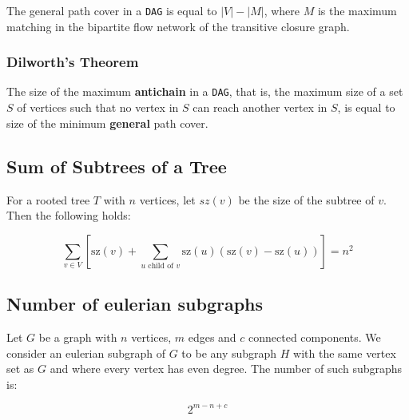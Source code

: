 The general path cover in a {\tt DAG} is equal to $|V| - |M|$, where $M$ is the maximum matching in the bipartite flow network of the transitive closure graph.

\subsubsection{Dilworth's Theorem}

The size of the maximum \textbf{antichain} in a {\tt DAG}, that is, the maximum size of a set $S$ of vertices such that no vertex in $S$ can reach another vertex in $S$, is equal to size of the minimum \textbf{general} path cover.

\subsection{Sum of Subtrees of a Tree}

For a rooted tree $T$ with $n$ vertices, let $sz(v)$ be the size of the subtree of $v$. Then the following holds:

$$ \sum_{v \in V} \left[\text{sz}(v) + \sum_{u \text{ child of } v} \text{sz}(u)(\text{sz}(v) - \text{sz}(u))\right] = n^2 $$

\subsection{Number of eulerian subgraphs}

Let $G$ be a graph with $n$ vertices, $m$ edges and $c$ connected components. We consider an eulerian subgraph of $G$ to be any subgraph $H$ with the same vertex set as $G$ and where every vertex has even degree. The number of such subgraphs is:

$$
2^{m-n+c}
$$
